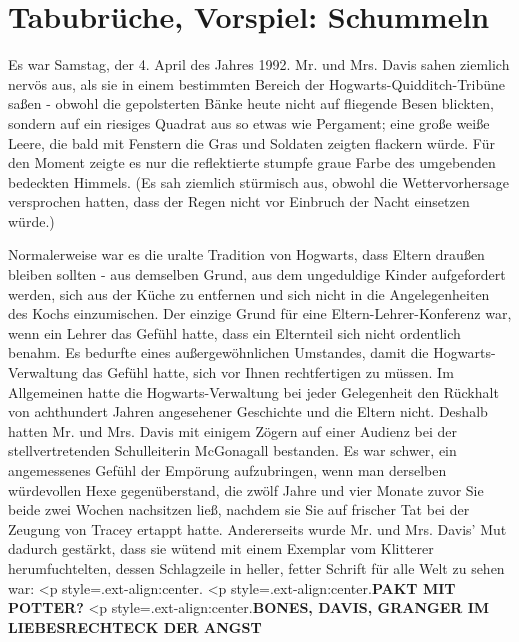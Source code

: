 \chapter{Tabubrüche, Vorspiel: Schummeln}

Es war Samstag, der 4. April des Jahres 1992. Mr. und Mrs. Davis sahen ziemlich
nervös aus, als sie in einem bestimmten Bereich der Hogwarts-Quidditch-Tribüne
saßen - obwohl die gepolsterten Bänke heute nicht auf fliegende Besen blickten,
sondern auf ein riesiges Quadrat aus so etwas wie Pergament; eine große weiße
Leere, die bald mit Fenstern die Gras und Soldaten zeigten flackern würde. Für
den Moment zeigte es nur die reflektierte stumpfe graue Farbe des umgebenden
bedeckten Himmels. (Es sah ziemlich stürmisch aus, obwohl die Wettervorhersage
versprochen hatten, dass der Regen nicht vor Einbruch der Nacht einsetzen
würde.)

Normalerweise war es die uralte Tradition von Hogwarts, dass Eltern draußen
bleiben sollten - aus demselben Grund, aus dem ungeduldige Kinder aufgefordert
werden, sich aus der Küche zu entfernen und sich nicht in die Angelegenheiten
des Kochs einzumischen. Der einzige Grund für eine Eltern-Lehrer-Konferenz war,
wenn ein Lehrer das Gefühl hatte, dass ein Elternteil sich nicht ordentlich
benahm. Es bedurfte eines außergewöhnlichen Umstandes, damit die
Hogwarts-Verwaltung das Gefühl hatte, sich vor Ihnen rechtfertigen zu müssen. Im
Allgemeinen hatte die Hogwarts-Verwaltung bei jeder Gelegenheit den Rückhalt von
achthundert Jahren angesehener Geschichte und die Eltern nicht. Deshalb hatten
Mr. und Mrs. Davis mit einigem Zögern auf einer Audienz bei der
stellvertretenden Schulleiterin McGonagall bestanden. Es war schwer, ein
angemessenes Gefühl der Empörung aufzubringen, wenn man derselben würdevollen
Hexe gegenüberstand, die zwölf Jahre und vier Monate zuvor Sie beide zwei Wochen
nachsitzen ließ, nachdem sie Sie auf frischer Tat bei der Zeugung von Tracey
ertappt hatte. Andererseits wurde Mr. und Mrs. Davis' Mut dadurch gestärkt, dass
sie wütend mit einem Exemplar vom Klitterer herumfuchtelten, dessen Schlagzeile
in heller, fetter Schrift für alle Welt zu sehen war: <p
style=\grqq{}.ext-align:center\grqq{}.  <p
style=\grqq{}.ext-align:center\grqq{}.\textbf{PAKT MIT POTTER?}   <p
style=\grqq{}.ext-align:center\grqq{}.\textbf{BONES, DAVIS, GRANGER IM
LIEBESRECHTECK DER ANGST}

